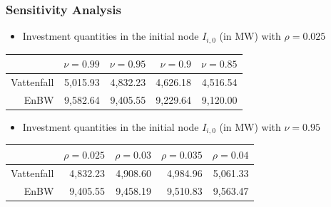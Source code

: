 \begin{frame}
  \frametitle{Sensitivity Analysis}

  \begin{itemize}
  \item Investment quantities in the initial node $I_{i,0}$ (in MW) with $\rho=0.025$
  \end{itemize}

\begin{center}
  \begin{tabular}{rrrrr}
\hline
           &       $\nu=0.99$ &       $\nu=0.95$ &        $\nu=0.9$ &       $\nu=0.85$ \\
\hline\hline
 Vattenfall  &      5,015.93  &      4,832.23  &      4,626.18  &      4,516.54  \\

     EnBW  &      9,582.64  &      9,405.55  &      9,229.64  &      9,120.00  \\
\hline
\end{tabular}
\end{center}

\begin{itemize}
\item Investment quantities in the initial node $I_{i,0}$ (in MW) with $\nu=0.95$
\end{itemize}

\begin{center}
  \begin{tabular}{rrrrr}
\hline
           &      $\rho=0.025$ &       $\rho=0.03$ &      $\rho=0.035$ &       $\rho=0.04$ \\
\hline\hline
Vattenfall &      4,832.23  &      4,908.60  &      4,984.96  &      5,061.33  \\

      EnBW &      9,405.55  &      9,458.19  &      9,510.83  &      9,563.47  \\
\hline
\end{tabular}  
\end{center}

\end{frame}

